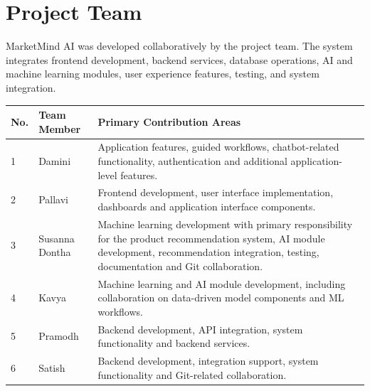 \documentclass[12pt,a4paper]{report}
\begin{document}

\chapter*{Project Team}


\begin{tcolorbox}[
    colback=lightgray,
    colframe=primaryblue,
    arc=3mm,
    boxrule=0.8pt,
    title=\textbf{MarketMind AI Development Team}
]

MarketMind AI was developed collaboratively by the project team.
The system integrates frontend development, backend services,
database operations, AI and machine learning modules, user
experience features, testing, and system integration.

\end{tcolorbox}

\vspace{0.5cm}

\begin{longtable}{p{0.8cm} p{3.5cm} p{8cm}}

\toprule

\textbf{No.} &
\textbf{Team Member} &
\textbf{Primary Contribution Areas}

\\

\midrule

1 &
Damini &
Application features, guided workflows, chatbot-related functionality,
authentication and additional application-level features.
\\[8pt]

2 &
Pallavi &
Frontend development, user interface implementation,
dashboards and application interface components.
\\[8pt]

3 &
Susanna Dontha &
Machine learning development with primary responsibility for
the product recommendation system, AI module development,
recommendation integration, testing, documentation and Git collaboration.
\\[8pt]

4 &
Kavya &
Machine learning and AI module development, including
collaboration on data-driven model components and ML workflows.
\\[8pt]

5 &
Pramodh &
Backend development, API integration,
system functionality and backend services.
\\[8pt]

6 &
Satish &
Backend development, integration support,
system functionality and Git-related collaboration.
\\

\bottomrule

\end{longtable}
\end{document}
